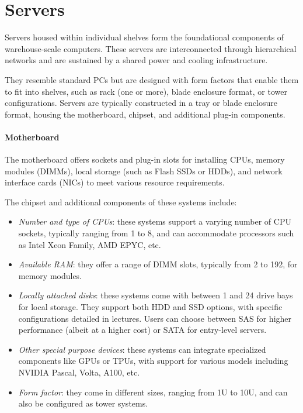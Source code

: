 \section{Servers}

Servers housed within individual shelves form the foundational components of warehouse-scale computers. 
These servers are interconnected through hierarchical networks and are sustained by a shared power and cooling infrastructure.

They resemble standard PCs but are designed with form factors that enable them to fit into shelves, such as rack (one or more), blade enclosure format, or tower configurations. 
Servers are typically constructed in a tray or blade enclosure format, housing the motherboard, chipset, and additional plug-in components.

\paragraph*{Motherboard}
The motherboard offers sockets and plug-in slots for installing CPUs, memory modules (DIMMs), local storage (such as Flash SSDs or HDDs), and network interface cards (NICs) to meet various resource requirements.

The chipset and additional components of these systems include:
\begin{itemize}
    \item \textit{Number and type of CPUs}: these systems support a varying number of CPU sockets, typically ranging from 1 to 8, and can accommodate processors such as Intel Xeon Family, AMD EPYC, etc.
    \item \textit{Available RAM}: they offer a range of DIMM slots, typically from 2 to 192, for memory modules.
    \item \textit{Locally attached disks}: these systems come with between 1 and 24 drive bays for local storage. 
        They support both HDD and SSD options, with specific configurations detailed in lectures. 
        Users can choose between SAS for higher performance (albeit at a higher cost) or SATA for entry-level servers.
    \item \textit{Other special purpose devices}: these systems can integrate specialized components like GPUs or TPUs, with support for various models including NVIDIA Pascal, Volta, A100, etc.
    \item \textit{Form factor}: they come in different sizes, ranging from 1U to 10U, and can also be configured as tower systems.
\end{itemize}

